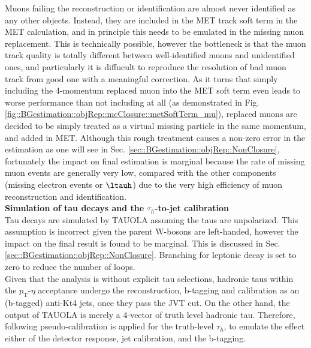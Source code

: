 Muons failing the reconstruction or identification are almost never identified as any other objects. Instead, they are included in the MET track soft term in the MET calculation, and in principle this needs to be emulated in the missing muon replacement. This is technically possible, however the bottleneck is that the muon track quality is totally different between well-identified muons and unidentified ones, and particularly it is diffucult to reproduce the resolution of bad muon track from good one with a meaningful correction. As it turns that simply including the 4-momentum replaced muon into the MET soft term even leads to worse performance than not including at all (as demonstrated in Fig. \ref{fig::BGestimation::objRep::mcClosure::metSoftTerm_mu}), replaced muons are decided to be simply treated as a virtual missing particle in the same momentum, and added in MET.
Although this rough treatment causes a non-zero error in the estimation as one will see in Sec. \ref{sec::BGestimation::objRep::NonClosure}, fortunately the impact on final estimation is marginal because the rate of missing muon events are generally very low, compared with the other components (missing electron events or $\ltauh$) due to the very high efficiency of muon reconstruction and identification. \\


\noindent \textbf{Simulation of tau decays and the $\tau_h$-to-jet calibration } \\
Tau decays are simulated by TAUOLA \cite{TAUOLA1} \cite{TAUOLA2} \cite{TAUOLA3} assuming the taus are unpolarized. This assumption is incorrect given the parent W-bosons are left-handed, however the impact on the final result is found to be marginal. This is discussed in Sec. \ref{sec::BGestimation::objRep::NonClosure}. Branching for leptonic decay is set to zero to reduce the number of loops. \\

Given that the analysis is without explicit tau selections, hadronic taus within the $p_{\mathrm{T}}$-$\eta$ acceptance undergo the reconstruction, b-tagging and calibration as an (b-tagged) anti-Kt4 jets, once they pass the JVT cut. On the other hand, the output of TAUOLA is merely a 4-vector of truth level hadronic tau. Therefore, following pseudo-calibration is applied for the truth-level $\tau_h$, to emulate the effect either of the detector response, jet calibration, and the b-tagging.\\

